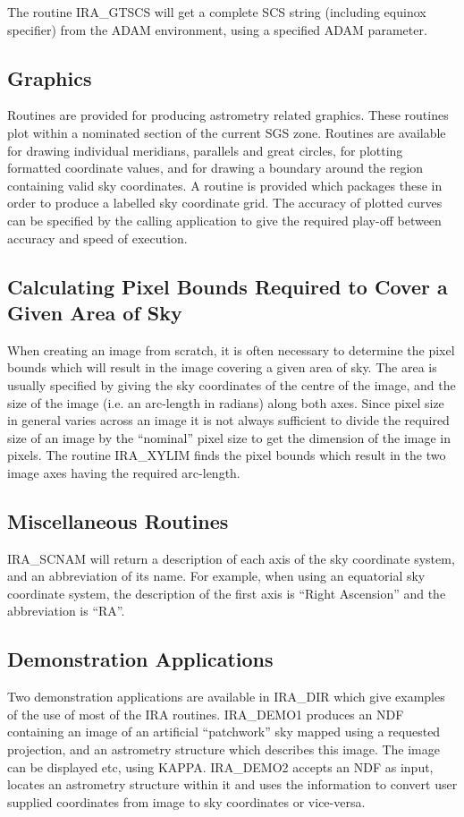 The routine IRA\_GTSCS will get a complete SCS string (including equinox 
specifier) from the ADAM environment, using a specified ADAM parameter.

\subsection {Graphics}
Routines are provided for producing astrometry related graphics. These routines
plot within a nominated section of the current SGS zone. Routines are available
for drawing individual meridians, parallels and great circles, for plotting
formatted coordinate values, and for drawing a boundary around the region
containing valid sky coordinates. A routine is provided which packages these in
order to produce a labelled sky coordinate grid. The accuracy of plotted curves
can be specified by the calling application to give the required play-off
between accuracy and speed of execution. 

\subsection {Calculating Pixel Bounds Required to Cover a Given Area of Sky}
When creating an image from scratch, it is often necessary to determine the
pixel bounds which will result in the image covering a given area of sky. The
area is usually specified by giving the sky coordinates of the centre of the
image, and the size of the image (i.e. an arc-length in radians) along both
axes. Since pixel size in general varies across an image it is not always
sufficient to divide the required size of an image by the ``nominal'' pixel size
to get the dimension of the image in pixels. The routine IRA\_XYLIM finds the 
pixel bounds which result in the two image axes having the required arc-length.

\subsection {Miscellaneous Routines}
IRA\_SCNAM will return a description of each axis of the sky coordinate system,
and an abbreviation of its name. For example, when using an equatorial sky
coordinate system, the description of the first axis is ``Right Ascension'' and
the abbreviation is ``RA''. 

\subsection {Demonstration Applications}
Two demonstration applications are available in IRA\_DIR which give examples of
the use of most of the IRA routines. IRA\_DEMO1 produces an NDF containing an
image of an artificial ``patchwork'' sky mapped using a requested projection,
and an astrometry structure which describes this image. The image can be
displayed etc, using KAPPA. IRA\_DEMO2 accepts an NDF as input, locates an
astrometry structure within it and uses the information to convert user supplied
coordinates from image to sky coordinates or vice-versa. 

